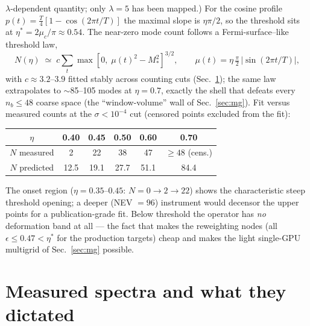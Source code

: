 \documentclass[11pt]{article}
\newcommand{\muc}{\mu_c}
\begin{document}
$\lambda$-dependent quantity; only $\lambda = 5$ has been mapped.)  For the cosine profile
$p(t) = \tfrac{T}{4}\left[1-\cos(2\pi t/T)\right]$ the maximal slope is
$\eta\pi/2$, so the threshold sits at
$\eta^{*} = 2\muc/\pi \approx 0.54$.  The near-zero mode count follows
a Fermi-surface--like threshold law,
\begin{equation}
N(\eta) \;\simeq\; c \sum_t \max\!\left[0,\;
\mu(t)^2 - M_*^2\right]^{3/2},
\qquad \mu(t) = \eta\,\tfrac{\pi}{2}\,|\sin(2\pi t/T)| ,
\label{eq:threshold}
\end{equation}
with $c \approx 3.2$--$3.9$ fitted stably across counting cuts
(Sec.~\ref{sec:spectra}); the same law extrapolates to $\sim$85--105
modes at $\eta = 0.7$, exactly the shell that defeats every
$n_b \le 48$ coarse space (the ``window-volume'' wall of
Sec.~\ref{sec:mg}).  Fit versus measured counts at the
$\sigma < 10^{-4}$ cut (censored points excluded from the fit):

\begin{center}
\begin{tabular}{cccccc}
\toprule
$\eta$ & 0.40 & 0.45 & 0.50 & 0.60 & 0.70 \\
\midrule
$N$ measured & 2 & 22 & 38 & 47 & $\ge48$ (cens.) \\
$N$ predicted & 12.5 & 19.1 & 27.7 & 51.1 & 84.4 \\
\bottomrule
\end{tabular}
\end{center}

The onset region ($\eta = 0.35$--$0.45$: $N = 0 \to 2 \to 22$) shows
the characteristic steep threshold opening; a deeper
(NEV $= 96$) instrument would decensor the upper points for a
publication-grade fit.  Below threshold the operator has \emph{no}
deformation band at all --- the fact that makes the reweighting nodes
(all $\epsilon \le 0.47 < \eta^*$ for the production targets) cheap and
makes the light single-GPU multigrid of Sec.~\ref{sec:mg} possible.

\section{Measured spectra and what they dictated}
\label{sec:spectra}
\end{document}
